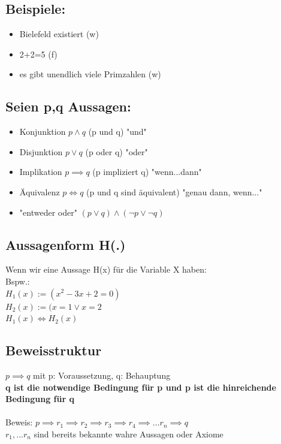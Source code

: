 \documentclass{article}
\begin{document}
       \subsection*{Beispiele:}
            \begin{itemize}
                \item Bielefeld existiert (w)
                \item 2+2=5 (f)
                \item es gibt unendlich viele Primzahlen (w)
            \end{itemize}

       \subsection*{Seien p,q Aussagen:}
            \begin{itemize}
                \item Konjunktion $p \land q$ (p und q) "und"
                \item Disjunktion $p\lor q$ (p oder q) "oder"
                \item Implikation $p \implies q$ (p impliziert q) "wenn...dann"
                \item Äquivalenz $p\iff q$ (p und q sind äquivalent) "genau dann, wenn..."
                \item "entweder oder" $(p \lor q)\land (\lnot p\lor \lnot q)$
            \end{itemize}

        \subsection*{Aussagenform H(.)}
            Wenn wir eine Aussage H(x) für die Variable X haben:\\
            Bspw.:\\
            $H_1(x):=(x^2-3x+2=0)$\\
            $H_2(x):=(x=1\lor x=2$\\
            $H_1(x)\iff H_2(x)$
        
        \subsection*{Beweisstruktur}
            $p\implies q$ mit p: Voraussetzung, q: Behauptung\\
            \textbf{q ist die notwendige Bedingung für p und p ist die hinreichende Bedingung für q}\\\\
            Beweis: $p \implies r_1\implies r_2\implies r_3\implies r_4\implies ... r_n\implies q$\\
            $r_1, ... r_n$ sind bereits bekannte wahre Aussagen oder Axiome
        
\end{document}
